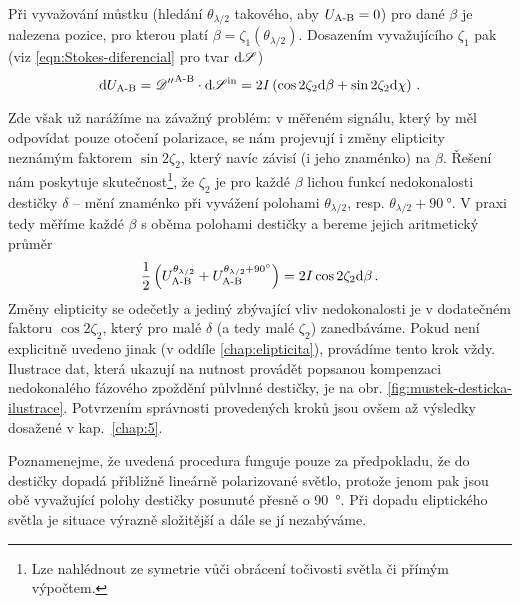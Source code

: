 Při vyvažování můstku (hledání $\theta_{\lambda/2}$ takového, aby $U_\textrm{A-B}=0$) pro dané $\beta$ je nalezena pozice, pro kterou platí $\beta=\zeta_1(\theta_{\lambda/2})$.
Dosazením vyvažujícího $\zeta_1$ pak (viz \eqref{eqn:Stokes-diferencial} pro tvar $\textrm{d}\mathscr{S}$)
\begin{equation}
\label{eqn:mustek-s-elipticitou}
    \textrm{d}U_\textrm{A-B} = {\mathscr{D}''}^\textrm{A-B} \cdot \textrm{d}\mathscr{S}^\textrm{in} = 2I\left(\cos2\zeta_2 \textrm{d}\beta + \sin2\zeta_2\textrm{d}\chi\right)  \,.
\end{equation}

Zde však už narážíme na závažný problém: v měřeném signálu, který by měl odpovídat pouze otočení polarizace, se nám projevují i změny elipticity neznámým faktorem $\sin2\zeta_2$, který navíc závisí (i jeho znaménko) na $\beta$.
Řešení nám poskytuje skutečnost\footnote{Lze nahlédnout ze symetrie vůči obrácení točivosti světla či přímým výpočtem.}, že $\zeta_2$ je pro každé $\beta$ lichou funkcí nedokonalosti destičky $\delta$ -- mění znaménko při vyvážení polohami $\theta_{\lambda/2}$, resp. $\theta_{\lambda/2}+\SI{90}{\degree}$.
V praxi tedy měříme každé $\beta$ s oběma polohami destičky a bereme jejich aritmetický průměr
\begin{equation}
\label{eqn:mustek-kompenzace-desticek-prumer}
    \frac{1}{2}\left(U_\textrm{A-B}^{\theta_{\lambda/2}}+U_\textrm{A-B}^{\theta_{\lambda/2}+\SI{90}{\degree}}\right) = 2I\cos2\zeta_2 \textrm{d}\beta \,.
\end{equation}
Změny elipticity se odečetly a jediný zbývající vliv nedokonalosti je v dodatečném faktoru $\cos2\zeta_2$, který pro malé $\delta$ (a tedy malé $\zeta_2$) zanedbáváme.
Pokud není explicitně uvedeno jinak (v oddíle \ref{chap:elipticita}), provádíme tento krok vždy.
Ilustrace dat, která ukazují na nutnost provádět popsanou kompenzaci nedokonalého fázového zpoždění půlvlnné destičky, je na obr. \ref{fig:mustek-desticka-ilustrace}.
Potvrzením správnosti provedených kroků jsou ovšem až výsledky dosažené v kap.~\ref{chap:5}.

Poznamenejme, že uvedená procedura funguje pouze za předpokladu, že do destičky dopadá přibližně lineárně polarizované světlo, protože jenom pak jsou obě vyvažující polohy destičky posunuté přesně o \SI{90}{\degree}.
Při dopadu eliptického světla je situace výrazně složitější a dále se jí nezabýváme.

